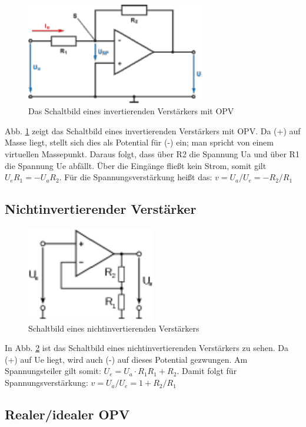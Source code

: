 \begin{figure}[H]
    \centering 
    \includegraphics[width=0.7\textwidth]{Abb/invamp.pdf}
    \caption{Das Schaltbild eines invertierenden Verstärkers mit OPV}
    \label{inv}
\end{figure}
Abb. \ref{inv} zeigt das Schaltbild eines invertierenden Verstärkers mit OPV. Da (+) auf Masse liegt, stellt sich dies als Potential für (-) ein; man spricht von einem virtuellen Massepunkt. Daraus folgt, dass über R2 die Spannung Ua und über R1 die Spannung Ue abfällt. Über die Eingänge fließt kein Strom, somit gilt $U_eR_1=-U_aR_2$. Für die Spannungsverstärkung heißt das:
$v= U_a/U_e =-R_2/R_1$

\subsection{Nichtinvertierender Verstärker}

\begin{figure}[H]
    \centering
    \includegraphics[width=0.5\textwidth]{Abb/ninv.pdf} 
    \caption{Schaltbild eines nichtinvertierenden Verstärkers}
    \label{ninv}
\end{figure}
In Abb. \ref{ninv} ist das Schaltbild eines nichtinvertierenden Verstärkers zu sehen. Da (+) auf Ue liegt, wird auch (-) auf dieses Potential gezwungen. Am Spannungsteiler gilt somit:
$U_e=U_a·R_1R_1+R_2$. 
Damit folgt für Spannungsverstärkung:
$v=U_a/U_e=1+R_2/R_1$

\subsection{Realer/idealer OPV}

